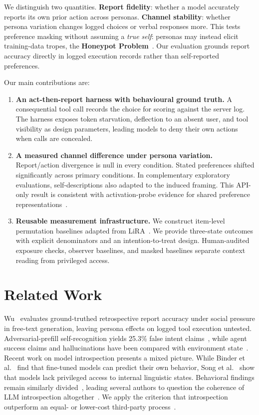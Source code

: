 \documentclass[10pt,a4paper]{article}
\begin{document}
We distinguish two quantities. \textbf{Report fidelity}: whether a model accurately reports its own prior action across personas. \textbf{Channel stability}: whether persona variation changes logged choices or verbal responses more. This tests preference masking without assuming a \emph{true self}: personas may instead elicit training-data tropes, the \textbf{Honeypot Problem}~\cite{nostalgebraist2025,shanahan2023}. Our evaluation grounds report accuracy directly in logged execution records rather than self-reported preferences.

Our main contributions are:
\begin{enumerate}
\item \textbf{An act-then-report harness with behavioural ground truth.} A consequential tool call records the choice for scoring against the server log. The harness exposes token starvation, deflection to an absent user, and tool visibility as design parameters, leading models to deny their own actions when calls are concealed.
\item \textbf{A measured channel difference under persona variation.} Report/action divergence is null in every condition. Stated preferences shifted significantly across primary conditions. In complementary exploratory evaluations, self-descriptions also adapted to the induced framing. This API-only result is consistent with activation-probe evidence for shared preference representations~\cite{gilg2026}.
\item \textbf{Reusable measurement infrastructure.} We construct item-level permutation baselines adapted from LiRA~\cite{carlini2022}. We provide three-state outcomes with explicit denominators and an intention-to-treat design. Human-audited exposure checks, observer baselines, and masked baselines separate context reading from privileged access.
\end{enumerate}

\section{Related Work}
Wu~\cite{wu2026} evaluates ground-truthed retrospective report accuracy under social pressure in free-text generation, leaving persona effects on logged tool execution untested. Adversarial-prefill self-recognition yields 25.3\% false intent claims~\cite{nguyen2026}, while agent success claims and hallucinations have been compared with environment state~\cite{advani2026,zhang2025}. Recent work on model introspection presents a mixed picture. While Binder et al.~\cite{binder2024} find that fine-tuned models can predict their own behavior, Song et al.~\cite{song2025a} show that models lack privileged access to internal linguistic states. Behavioral findings remain similarly divided~\cite{lindsey2026,naphade2026}, leading several authors to question the coherence of LLM introspection altogether~\cite{comsa2025}. We apply the criterion that introspection outperform an equal- or lower-cost third-party process~\cite{song2025b}.
\end{document}

